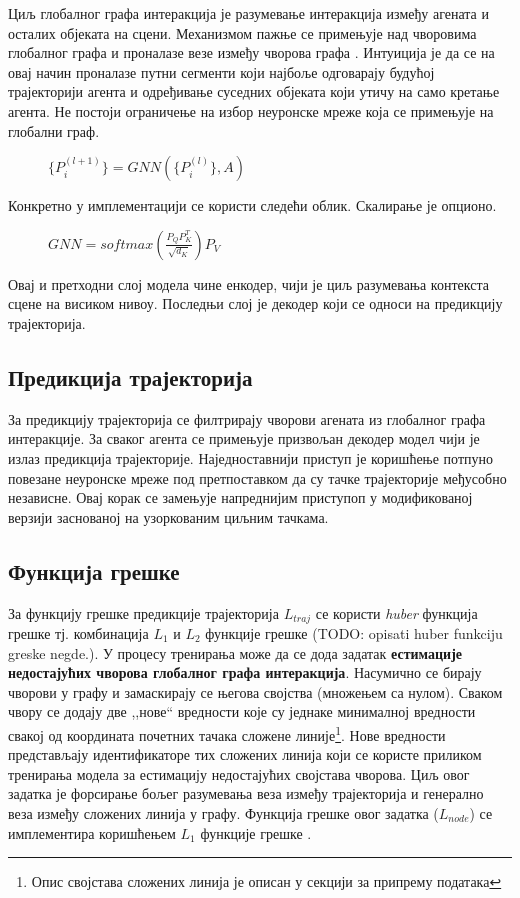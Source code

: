 \documentclass[11pt,oneside]{memoir}
\begin{document}
Циљ глобалног графа интеракција је разумевање интеракција између агената и осталих објеката на сцени. Механизмом пажње се примењује над 
чворовима глобалног графа и проналазе везе између чворова графа \cite{attention_is_all_you_need}. Интуиција је да се на овај начин проналазе путни сегменти који најбоље одговарају будућој трајекторији агента и 
одређивање суседних објеката који утичу на само кретање агента. Не постоји ограничење на избор неуронске мреже која се примењује на глобални граф.

\begin{figure}[H]
  \centering
  $\{P^{(l+1)}_{i}\} = GNN(\{P^{(l)}_{i}\}, A)$
\end{figure}

\noindent Конкретно у имплементацији се користи следећи облик. Скалирање је опционо.

\begin{figure}[H]
  \centering
  $GNN = softmax(\frac{P_{Q}P^{T}_{K}}{\sqrt{d_{K}}})P_{V}$
\end{figure}

Овај и претходни слој модела чине енкодер, чији је циљ разумевања контекста сцене на висиком нивоу. Последњи слој је декодер
који се односи на предикцију трајекторија.

\subsection{Предикција трајекторија}

За предикцију трајекторија се филтрирају чворови агената из глобалног графа интеракције. За сваког агента се примењује призвољан декодер модел
чији је излаз предикција трајекторије. Наједноставнији приступ је коришћење потпуно повезане неуронске мреже под претпоставком да су 
тачке трајекторије међусобно независне. Овај корак се замењује напреднијим приступоп у модификованој верзији заснованој на узоркованим циљним тачкама.

\subsection{Функција грешке}

За функцију грешке предикције трајекторија $L_{traj}$ се користи \textit{huber} функција грешке тј. комбинација $L_1$ и $L_2$ функције грешке 
(TODO: opisati huber funkciju greske negde.). 
У процесу тренирања може да се дода задатак \textbf{естимације недостајућих чворова глобалног графа интеракција}. Насумично се бирају чворови у графу и замаскирају
се његова својства (множењем са нулом). Сваком чвору се додају две ,,нове`` вредности које су једнаке минималној вредности свакој од координата почетних 
тачака сложене линије\footnote{Опис својстава сложених линија је описан у секцији за припрему података}. Нове вредности представљају идентификаторе
тих сложених линија који се користе приликом тренирања модела за естимацију недостајућих својстава чворова. Циљ овог задатка је форсирање бољег разумевања
веза између трајекторија и генерално веза између сложених линија у графу. Функција грешке овог задатка ($L_{node}$) се имплементира коришћењем $L_1$
функције грешке \cite{vectornet}.
\end{document}
